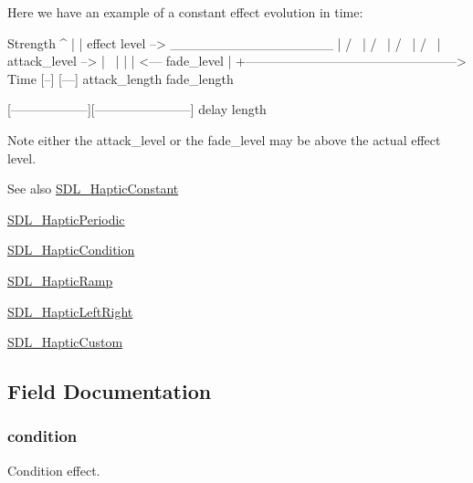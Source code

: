 Here we have an example of a constant effect evolution in time\+: \begin{DoxyVerb}Strength
^
|
|    effect level -->  _________________
|                     /                 \
|                    /                   \
|                   /                     \
|                  /                       \
| attack_level --> |                        \
|                  |                        |  <---  fade_level
|
+--------------------------------------------------> Time
                   [--]                 [---]
                   attack_length        fade_length

[------------------][-----------------------]
delay               length
\end{DoxyVerb}


Note either the attack\+\_\+level or the fade\+\_\+level may be above the actual effect level.

\begin{DoxySeeAlso}{See also}
\hyperlink{struct_s_d_l___haptic_constant}{S\+D\+L\+\_\+\+Haptic\+Constant} 

\hyperlink{struct_s_d_l___haptic_periodic}{S\+D\+L\+\_\+\+Haptic\+Periodic} 

\hyperlink{struct_s_d_l___haptic_condition}{S\+D\+L\+\_\+\+Haptic\+Condition} 

\hyperlink{struct_s_d_l___haptic_ramp}{S\+D\+L\+\_\+\+Haptic\+Ramp} 

\hyperlink{struct_s_d_l___haptic_left_right}{S\+D\+L\+\_\+\+Haptic\+Left\+Right} 

\hyperlink{struct_s_d_l___haptic_custom}{S\+D\+L\+\_\+\+Haptic\+Custom} 
\end{DoxySeeAlso}


\subsection{Field Documentation}
\subsubsection[{\texorpdfstring{condition}{condition}}]{ condition}\hypertarget{union_s_d_l___haptic_effect_af8fd644eaf678d5400af856cba7d235b}{}\label{union_s_d_l___haptic_effect_af8fd644eaf678d5400af856cba7d235b}
Condition effect. 
